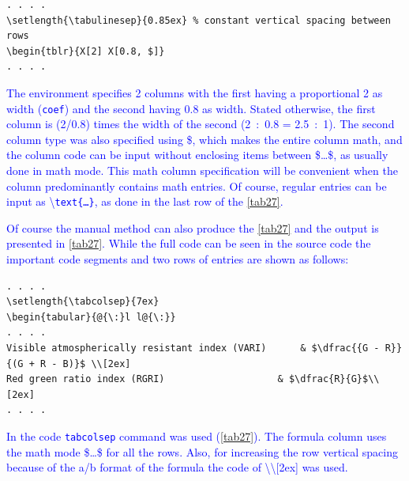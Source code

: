\documentclass[phd]{ndsu-thesis-2022}
\newcommand\italk[1]{\textcolor{blue}{#1}}  %
\newcommand\cmd[1]{\textbackslash\texttt{#1}}  %
\newcommand\vb[1]{\textcolor{blue}{\texttt{#1}}}%
\begin{document}
\vspace{-1ex}
{\singlespacing
\begin{verbatim}
. . . . 
\setlength{\tabulinesep}{0.85ex} % constant vertical spacing between rows
\begin{tblr}{X[2] X[0.8, $]}
. . . . 
\end{verbatim}
}

\vspace{-2ex}
\italk{The environment specifies 2 columns with the first having a proportional 2 as width (\vb{coef}) and the second having 0.8 as width. Stated otherwise, the first column is \fpeval{2/0.8} (2/0.8) times the width of the second (2~:~0.8 = 2.5~:~1). The second column type was also specified using \$, which makes the entire column math, and the column code can be input without enclosing items between \$\ldots\$, as usually done in math mode. This math column specification will be convenient when the column predominantly contains math entries. Of course, regular entries can be input as \cmd{text\{\ldots\}}, as done in the last row of the \cref{tab27}.
}

\italk{Of course the manual method can also produce the \cref{tab27} and the output is presented in \cref{tab27}.  While the full code can be seen in the source code the important code segments and two rows of entries are shown as follows:
}

{\singlespacing
\begin{verbatim}
. . . . 
\setlength{\tabcolsep}{7ex}
\begin{tabular}{@{\:}l l@{\:}}
. . . . 
Visible atmospherically resistant index (VARI) 		& $\dfrac{{G - R}}
{(G + R - B)}$ \\[2ex]
Red green ratio index (RGRI) 					& $\dfrac{R}{G}$\\[2ex]
. . . . 
\end{verbatim}
}

\vspace{-2ex}
\italk{In the code \vb{tabcolsep} command was used (\cref{tab27}). The formula column uses the math mode \$\ldots\$ for all the rows. Also, for increasing the row vertical spacing because of the a/b format of the formula the code of \textbackslash\textbackslash[2ex] was used.}
\end{document}
